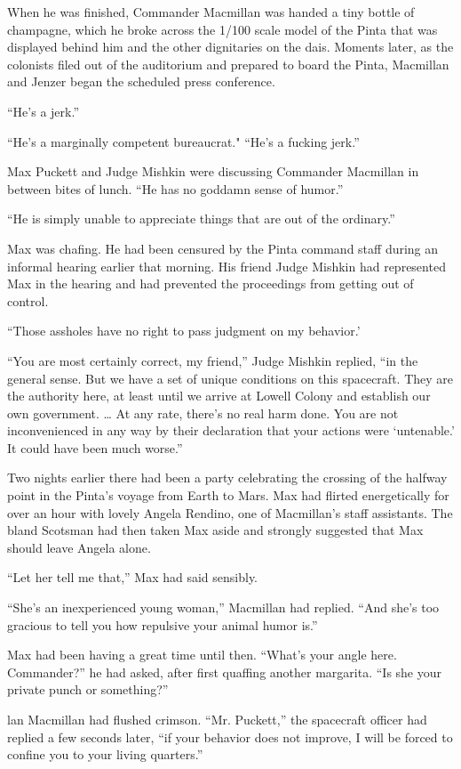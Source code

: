 \documentclass[]{article}
\begin{document}
{When he was finished, Commander Macmillan was handed a tiny bottle of champagne, which he broke across the 1/100 scale model of the Pinta that was displayed behind him and the other dignitaries on the dais.  Moments later, as the colonists filed out of the auditorium and prepared to board the Pinta, Macmillan and Jenzer began the scheduled press conference.

“He’s a jerk.”

“He’s a marginally competent bureaucrat."  “He’s a fucking jerk.”

Max Puckett and Judge Mishkin were discussing Commander Macmillan in between bites of lunch.  “He has no goddamn sense of humor.”

“He is simply unable to appreciate things that are out of the ordinary.”

Max was chafing.  He had been censured by the Pinta command staff during an informal hearing earlier that morning.  His friend Judge Mishkin had represented Max in the hearing and had prevented the proceedings from getting out of control.

“Those assholes have no right to pass judgment on my behavior.’

“You are most certainly correct, my friend,” Judge Mishkin replied, “in the general sense.  But we have a set of unique conditions on this spacecraft.  They are the authority here, at least until we arrive at Lowell Colony and establish our own government.  … At any rate, there’s no real harm done.  You are not inconvenienced in any way by their declaration that your actions were ‘untenable.’ It could have been much worse.”

Two nights earlier there had been a party celebrating the crossing of the halfway point in the Pinta’s voyage from Earth to Mars.  Max had flirted energetically for over an hour with lovely Angela Rendino, one of Macmillan’s staff assistants.  The bland Scotsman had then taken Max aside and strongly suggested that Max should leave Angela alone.

“Let her tell me that,” Max had said sensibly.

“She’s an inexperienced young woman,” Macmillan had replied.  “And she’s too gracious to tell you how repulsive your animal humor is.”

Max had been having a great time until then.  “What’s your angle here.  Commander?” he had asked, after first quaffing another margarita.  “Is she your private punch or something?”

lan Macmillan had flushed crimson.  “Mr.  Puckett,” the spacecraft officer had replied a few seconds later, “if your behavior does not improve, I will be forced to confine you to your living quarters.”

}
\end{document}
